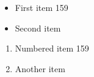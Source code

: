 \documentclass{article}
\begin{document}
\begin{itemize}
\item First item 159
\item Second item
\end{itemize}
\begin{enumerate}
\item Numbered item 159
\item Another item
\end{enumerate}
\end{document}
